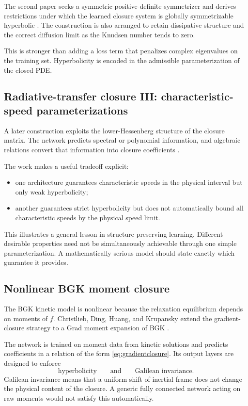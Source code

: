 \documentclass[11pt]{article}
\begin{document}
The second paper seeks a symmetric positive-definite symmetrizer and derives restrictions under which the learned closure system is globally symmetrizable hyperbolic \citep{huang2021rte2}. The construction is also arranged to retain dissipative structure and the correct diffusion limit as the Knudsen number tends to zero.

This is stronger than adding a loss term that penalizes complex eigenvalues on the training set. Hyperbolicity is encoded in the admissible parameterization of the closed PDE.

\subsection{Radiative-transfer closure III: characteristic-speed parameterizations}

A later construction exploits the lower-Hessenberg structure of the closure matrix. The network predicts spectral or polynomial information, and algebraic relations convert that information into closure coefficients \citep{huang2021rte3}.

The work makes a useful tradeoff explicit:
\begin{itemize}
  \item one architecture guarantees characteristic speeds in the physical interval but only weak hyperbolicity;
  \item another guarantees strict hyperbolicity but does not automatically bound all characteristic speeds by the physical speed limit.
\end{itemize}

This illustrates a general lesson in structure-preserving learning. Different desirable properties need not be simultaneously achievable through one simple parameterization. A mathematically serious model should state exactly which guarantee it provides.

\subsection{Nonlinear BGK moment closure}

The BGK kinetic model is nonlinear because the relaxation equilibrium depends on moments of \(f\). Christlieb, Ding, Huang, and Krupansky extend the gradient-closure strategy to a Grad moment expansion of BGK \citep{christlieb2025bgk}.

The network is trained on moment data from kinetic solutions and predicts coefficients in a relation of the form \eqref{eq:gradientclosure}. Its output layers are designed to enforce
\[
\boxed{\text{hyperbolicity}}
\qquad\text{and}\qquad
\boxed{\text{Galilean invariance}}.
\]
Galilean invariance means that a uniform shift of inertial frame does not change the physical content of the closure. A generic fully connected network acting on raw moments would not satisfy this automatically.
\end{document}
